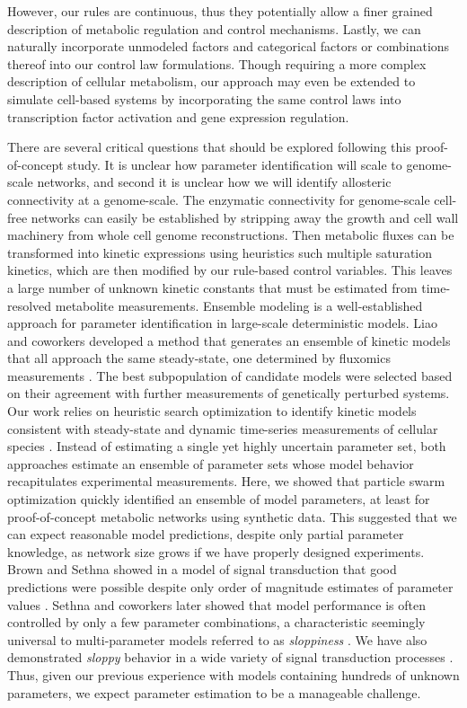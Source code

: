 \documentclass[12pt]{article}
\begin{document}
However, our rules are continuous, thus they potentially allow a finer grained description of metabolic regulation and control mechanisms.
Lastly, we can naturally incorporate unmodeled factors and categorical factors or combinations thereof into our control law formulations. 
Though requiring a more complex description of cellular metabolism, our approach may even be extended to simulate cell-based systems by incorporating the same control laws into transcription factor activation and gene expression regulation. 

There are several critical questions that should be explored following this proof-of-concept study.
It is unclear how parameter identification will scale to genome-scale networks, and second it is unclear how we will identify allosteric connectivity at a genome-scale. 
The enzymatic connectivity for genome-scale cell-free networks can easily be established by stripping away the growth and cell wall machinery from whole cell genome reconstructions.
Then metabolic fluxes can be transformed into kinetic expressions using heuristics such multiple saturation kinetics, which are then modified by our rule-based control variables.  
This leaves a large number of unknown kinetic constants that must be estimated from time-resolved metabolite measurements. 
Ensemble modeling is a well-established approach for parameter identification in large-scale deterministic models. 
Liao and coworkers developed a method that generates an ensemble of kinetic models that all approach the same steady-state, one determined by fluxomics measurements \cite{Tran:2008aa}. 
The best subpopulation of candidate models were selected based on their agreement with further measurements of genetically perturbed systems. 
Our work relies on heuristic search optimization to identify kinetic models consistent with steady-state and dynamic time-series measurements of cellular species \citep{Luan:2007aa,Song:2009aa,Tasseff:2010aa,Tasseff:2011aa,Nayak:2011aa,Lequieu:2011aa}. 
Instead of estimating a single yet highly uncertain parameter set, both approaches estimate an ensemble of parameter sets whose model behavior recapitulates experimental measurements. 
Here, we showed that particle swarm optimization quickly identified an ensemble of model parameters, at least for proof-of-concept metabolic networks using synthetic data. 
This suggested that we can expect reasonable model predictions, despite only partial parameter knowledge, as network size grows if we have properly designed experiments. 
Brown and Sethna showed in a model of signal transduction that good predictions were possible despite only order of magnitude estimates of parameter values \citep{Brown:2003aa}.
Sethna and coworkers later showed that model performance is often controlled by only a few parameter combinations, 
a characteristic seemingly universal to multi-parameter models referred to as \textit{sloppiness} \citep{Machta:2013aa}.
We have also demonstrated \textit{sloppy} behavior in a wide variety of signal transduction processes \citep{Luan:2007aa,Song:2009aa,Tasseff:2010aa,Tasseff:2011aa,Nayak:2011aa,Lequieu:2011aa}.
Thus, given our previous experience with models containing hundreds of unknown parameters, we expect parameter estimation to be a manageable challenge. 
\end{document}
